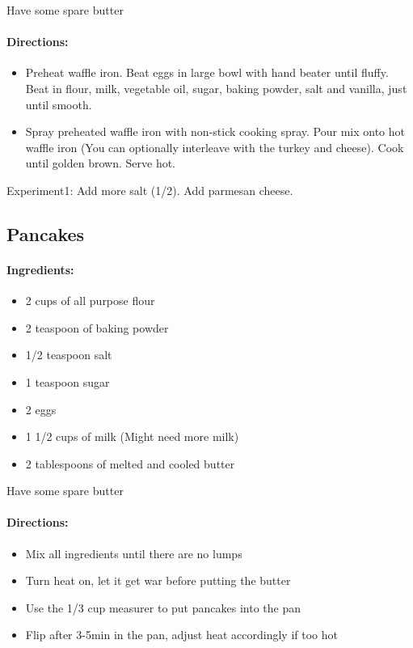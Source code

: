 \documentclass{article}
\begin{document}
Have some spare butter

\paragraph{Directions:}
\begin{itemize}
	\item Preheat waffle iron. Beat eggs in large bowl with hand beater until fluffy. Beat in flour, milk, vegetable oil, sugar, baking powder, salt and vanilla, just until smooth.
	\item Spray preheated waffle iron with non-stick cooking spray. Pour mix onto hot waffle iron (You can optionally interleave with the turkey and cheese). Cook until golden brown. Serve hot.
\end{itemize}

Experiment1: Add more salt (1/2). Add parmesan cheese.

\subsection{Pancakes}

\paragraph{Ingredients:}

\begin{itemize}
	\item 2 cups of all purpose flour 
	\item 2 teaspoon of baking powder 
	\item 1/2 teaspoon salt 
	\item 1 teaspoon sugar 
	\item 2 eggs 
	\item 1 1/2 cups of milk (Might need more milk)
	\item 2 tablespoons of melted and cooled butter
\end{itemize}

Have some spare butter

\paragraph{Directions:}
\begin{itemize}
	\item Mix all ingredients until there are no lumps 
	\item Turn heat on, let it get war before putting the butter 
	\item Use the 1/3 cup measurer to put pancakes into the pan 
	\item Flip after 3-5min in the pan, adjust heat accordingly if too hot
\end{itemize}
\end{document}
